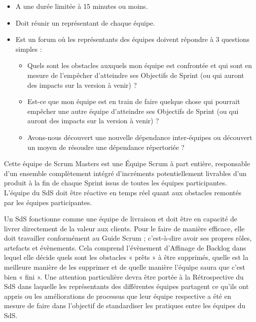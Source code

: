 \documentclass[12pt,a4paper,parskip=full]{scrartcl}
\begin{document}
\begin{itemize}
\item A une durée limitée à 15 minutes ou moins.
\item Doit réunir un représentant de chaque équipe.
\item Est un forum où les représentants des équipes doivent répondre à 3 questions
simples :
\begin{itemize}
\item Quels sont les obstacles auxquels mon équipe est confrontée et qui sont en
mesure de l’empêcher d’atteindre ses Objectifs de Sprint (ou qui auront des
impacts sur la version à venir) ?
\item Est-ce que mon équipe est en train de faire quelque chose qui pourrait
empêcher une autre équipe d’atteindre ses Objectifs de Sprint (ou qui auront
des impacts sur la version à venir) ?
\item Avons-nous découvert une nouvelle dépendance inter-équipes ou découvert
un moyen de résoudre une dépendance répertoriée ?
\end{itemize}
\end{itemize}
Cette équipe de Scrum Masters est une Équipe Scrum à part entière, responsable d’un
ensemble complètement intégré d’incréments potentiellement livrables d’un produit à la fin
de chaque Sprint issus de toutes les équipes participantes. L’équipe du SdS doit être
réactive en temps réel quant aux obstacles remontés par les équipes participantes.

Un SdS fonctionne comme une équipe de livraison et doit être en capacité de livrer
directement de la valeur aux clients. Pour le faire de manière efficace, elle doit travailler
conformément au Guide Scrum ; c’est-à-dire avoir ses propres rôles, artefacts et
évènements. Cela comprend l’évènement d’Affinage de Backlog dans lequel elle décide
quels sont les obstacles « prêts » à être supprimés, quelle est la meilleure manière de les
supprimer et de quelle manière l’équipe saura que c’est bien « fini ». Une attention
particulière devra être portée à la Rétrospective du SdS dans laquelle les représentants
des différentes équipes partagent ce qu’ils ont appris ou les améliorations de processus
que leur équipe respective a été en mesure de faire dans l’objectif de standardiser les
pratiques entre les équipes du SdS.
\end{document}
